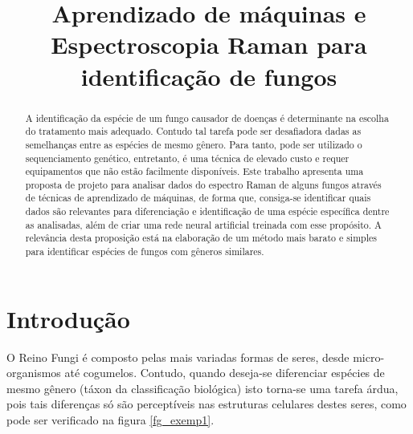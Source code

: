 \documentclass[conference,peerreview]{IEEEtran}
\begin{document}
\title{Aprendizado de máquinas e Espectroscopia Raman para identificação de fungos}


\author{
} %


\ifCLASSOPTIONpeerreview
	\setcounter{page}{1}
	\IEEEpeerreviewmaketitle
\else
	\maketitle
\fi


\begin{abstract}
A identificação da espécie de um fungo causador de doenças é determinante na escolha do tratamento mais adequado. Contudo tal tarefa pode ser desafiadora dadas as semelhanças entre as espécies de mesmo gênero. Para tanto, pode ser utilizado o sequenciamento genético, entretanto, é uma técnica de elevado custo e requer equipamentos que não estão facilmente disponíveis.
Este trabalho apresenta uma proposta de projeto para analisar dados do espectro Raman de alguns fungos através de técnicas de aprendizado de máquinas, de forma que, consiga-se identificar quais dados são relevantes para diferenciação e identificação de uma espécie específica dentre as analisadas, além de criar uma rede neural artificial treinada com esse propósito. 
A relevância desta proposição está na elaboração de um método mais barato e simples para identificar espécies de fungos com gêneros similares. 
\end{abstract}

\section{Introdução}
O Reino Fungi é composto pelas mais variadas formas de seres, desde micro-organismos até cogumelos. Contudo, quando deseja-se diferenciar espécies de mesmo gênero (táxon da classificação biológica) isto torna-se uma tarefa árdua, pois tais diferenças só são perceptíveis nas estruturas celulares destes seres, como pode ser verificado na figura \ref{fg_exemp1}.
\end{document}
